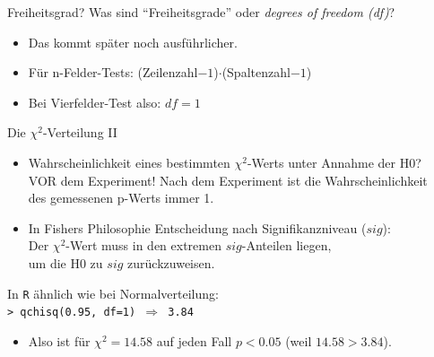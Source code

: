 \begin{frame}
  {Freiheitsgrad?}
  Was sind \alert{"`Freiheitsgrade"'} oder \textit{degrees of freedom (df)}?

  \begin{itemize}[<+->]
    \item Das kommt später noch ausführlicher.
    \item Für n-Felder-Tests: \alert{(Zeilenzahl$-1$)$\cdot$(Spaltenzahl$-1$)}
    \item Bei Vierfelder-Test also: $df=1$
  \end{itemize}
\end{frame}

\begin{frame}{Die $\chi^2$-Verteilung II}
  \begin{itemize}[<+->]
    \item Wahrscheinlichkeit eines bestimmten $\chi^2$-Werts unter Annahme der H0?\\
      \alert{VOR dem Experiment! Nach dem Experiment ist die Wahrscheinlichkeit\\
      des gemessenen p-Werts immer 1.}
      \vspace{\baselineskip}
    \item In Fishers Philosophie Entscheidung nach \alert{Signifikanzniveau} ($sig$):\\
      \alert{Der $\chi^2$-Wert muss in den extremen $sig$-Anteilen liegen,\\
      um die H0 zu $sig$ zurückzuweisen.}
  \end{itemize}
  \pause
  \begin{center}
    In \texttt{R} ähnlich wie bei Normalverteilung:\\
    \texttt{> qchisq(0.95, df=1) $\Rightarrow$ \texttt{3.84}}
  \end{center}
  \pause
  \begin{itemize}
    \item Also ist für $\chi^2=14.58$ auf jeden Fall $p<0.05$ (weil $14.58>3.84$).
  \end{itemize}
\end{frame}


